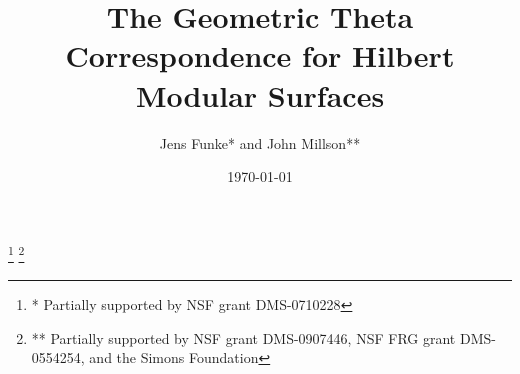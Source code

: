 \documentclass[12pt,leqno]{amsart}
\begin{document}
\title[The Geometric Theta Correspondence for Hilbert Modular Surfaces]
{The Geometric Theta Correspondence for Hilbert Modular Surfaces }

\author[Jens Funke and John Millson]{Jens Funke* and John Millson**}
\thanks{* Partially supported by NSF grant DMS-0710228}
\thanks{** Partially supported by NSF grant DMS-0907446, NSF FRG grant DMS-0554254, and the Simons Foundation}
\address{Department of Mathematical Sciences, University of Durham, Science Laboratories,
South Rd, Durham DH1 3LE, United Kingdom}
\address{Department of Mathematics, University of Maryland, College Park, MD
20742, USA} 

\date{\today}

\maketitle
























































\end{document}
